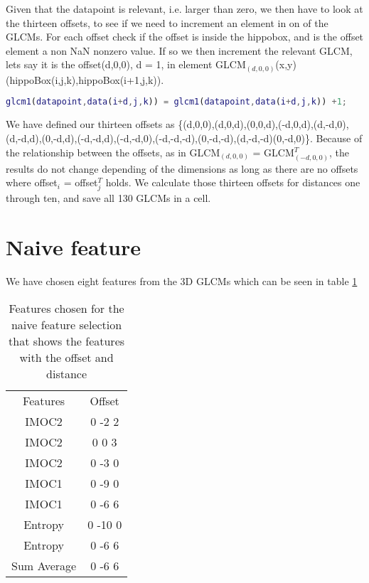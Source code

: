 Given that the datapoint is relevant, i.e. larger than zero, we then have to look at the thirteen offsets, to see if we need to increment an element in on of the GLCMs. For each offset check if the offset is inside the hippobox, and is the offset element a non NaN nonzero value. If so we then increment the relevant GLCM, lets say it is the offset(d,0,0), d = 1, in element GLCM$_(d,0,0)$(x,y) (hippoBox(i,j,k),hippoBox(i+1,j,k)).

\begin{lstlisting}[language=Matlab]
            glcm1(datapoint,data(i+d,j,k)) = glcm1(datapoint,data(i+d,j,k)) +1;
\end{lstlisting}

We have defined our thirteen offsets as \{(d,0,0),(d,0,d),(0,0,d),(-d,0,d),(d,-d,0),(d,-d,d),(0,-d,d),(-d,-d,d),(-d,-d,0),(-d,-d,-d),(0,-d,-d),(d,-d,-d)(0,-d,0)\}.
Because of the relationship between the offsets, as in GLCM$_{(d,0,0)}$ = GLCM$_{(-d,0,0)}^T$, the results do not change depending of the dimensions as long as there are no offsets where offset$_i$ = offset$_j^T$ holds.
We calculate those thirteen offsets for distances one through ten, and save all 130 GLCMs in a cell.

\section{Naive feature}

We have chosen eight features from the 3D GLCMs which can be seen in table \ref{tab:naivefeaturesel}

\begin{table}
  \centering
  \begin{tabular}{|c|c|}
    \hline
    Features & Offset \\
    IMOC2 & 0 -2 2 \\
    IMOC2 & 0 0 3 \\
    IMOC2 & 0 -3 0 \\
    IMOC1 & 0 -9 0 \\
    IMOC1 & 0 -6 6 \\
    Entropy & 0 -10 0 \\
    Entropy & 0 -6 6 \\
    Sum Average & 0 -6 6 \\
    \hline
  \end{tabular}
  \caption{Features chosen for the naive feature selection that shows the features with the offset and distance}\label{tab:naivefeaturesel}
\end{table}

